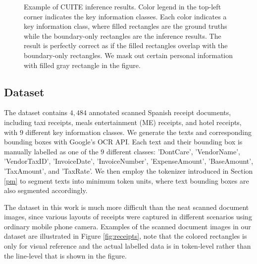 \documentclass[10pt,twocolumn,letterpaper]{article}
\begin{document}
\begin{figure}
\begin{center}
\end{center}
   \caption{Example of CUITE inference results. Color legend in the top-left corner indicates the key information classes. Each color indicates a key information class, where filled rectangles are the ground truths while the boundary-only rectangles are the inference results. The result is perfectly correct as if the filled rectangles overlap with the boundary-only rectangles. We mask out certain personal information with filled gray rectangle in the figure.}
\label{fig:result}
\end{figure}

\subsection{Dataset}
The dataset contains $4,484$ annotated scanned Spanish receipt documents, including taxi receipts, meals entertainment (ME) receipts, and hotel receipts, with $9$ different key information classes. We generate the texts and corresponding bounding boxes with Google's OCR API. Each text and their bounding box is manually labelled as one of the $9$ different classes: 'DontCare', 'VendorName', 'VendorTaxID', 'InvoiceDate', 'InvoiceNumber', 'ExpenseAmount', 'BaseAmount', 'TaxAmount', and 'TaxRate'. We then employ the tokenizer introduced in Section \ref{pm} to segment texts into minimum token units, where text bounding boxes are also segmented accordingly. 

The dataset in this work is much more difficult than the neat scanned document images, since various layouts of receipts were captured in different scenarios using ordinary mobile phone camera. Examples of the scanned document images in our dataset are illustrated in Figure \ref{fig:receipts}, note that the colored rectangles is only for visual reference and the actual labelled data is in token-level rather than the line-level that is shown in the figure.
\end{document}

